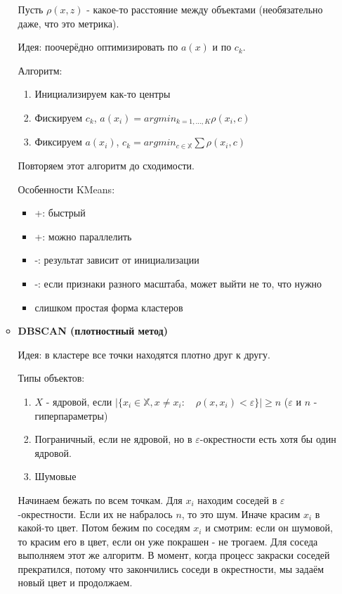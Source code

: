 \documentclass[a4paper]{article}
\begin{document}
\begin{itemize}
\begin{itemize}
Пусть $\rho(x, z)$ - какое-то расстояние между объектами (необязательно даже, что это метрика).

Идея: поочерёдно оптимизировать по $a(x)$ и по $c_k$.

Алгоритм:
\begin{enumerate}
\item Инициализируем как-то центры
\item Фискируем $c_k$, $a(x_i) = argmin_{k=1,...,K} \rho(x_i, c)$
\item Фиксируем $a(x_i)$, $c_k = argmin_{c \in \mathbb{X}} \sum \rho(x_i, c)$
\end{enumerate}

Повторяем этот алгоритм до сходимости.

Особенности KMeans:
\begin{itemize}
\item +: быстрый
\item +: можно параллелить
\item -: результат зависит от инициализации
\item -: если признаки разного масштаба, может выйти не то, что нужно
\item слишком простая форма кластеров
\end{itemize}

\item \textbf{DBSCAN (плотностный метод)}

Идея: в кластере все точки находятся плотно друг к другу.

Типы объектов:
\begin{enumerate}
\item $X$ - ядровой, если $|\{ x_i \in \mathbb{X}, x \neq x_i: \quad \rho(x, x_i) < \varepsilon \} | \geq n$ ($\varepsilon$ и $n$ - гиперпараметры)
\item Пограничный, если не ядровой, но в $\varepsilon$-окрестности есть хотя бы один ядровой.
\item Шумовые
\end{enumerate}

Начинаем бежать по всем точкам. Для $x_i$ находим соседей в $\varepsilon$-окрестности. Если их не набралось $n$, то это шум. Иначе красим $x_i$ в какой-то цвет. Потом бежим по соседям $x_i$ и смотрим: если он шумовой, то красим его в цвет, если он уже покрашен - не трогаем. Для соседа выполняем этот же алгоритм.
В момент, когда процесс закраски соседей прекратился, потому что закончились соседи в окрестности, мы задаём новый цвет и продолжаем.
\end{itemize}


\end{itemize}
\end{document}
